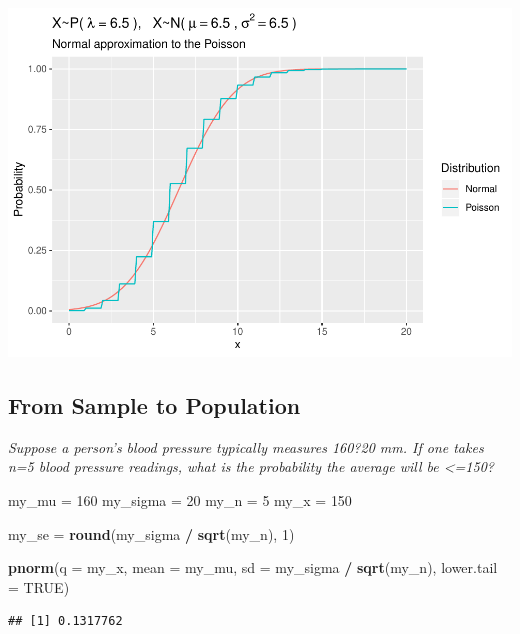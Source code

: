 \documentclass[]{book}
\newenvironment{Shaded}{\begin{snugshade}}{\end{snugshade}}
\newcommand{\DataTypeTok}[1]{\textcolor[rgb]{0.13,0.29,0.53}{#1}}
\newcommand{\DecValTok}[1]{\textcolor[rgb]{0.00,0.00,0.81}{#1}}
\newcommand{\KeywordTok}[1]{\textcolor[rgb]{0.13,0.29,0.53}{\textbf{#1}}}
\newcommand{\NormalTok}[1]{#1}
\newcommand{\OperatorTok}[1]{\textcolor[rgb]{0.81,0.36,0.00}{\textbf{#1}}}
\newcommand{\OtherTok}[1]{\textcolor[rgb]{0.56,0.35,0.01}{#1}}
\newcommand{\StringTok}[1]{\textcolor[rgb]{0.31,0.60,0.02}{#1}}
\begin{document}
\includegraphics{data-sci_files/figure-latex/unnamed-chunk-18-1.pdf}

\hypertarget{from-sample-to-population}{%
\subsection{From Sample to Population}\label{from-sample-to-population}}

\emph{Suppose a person's blood pressure typically measures 160?20 mm. If one takes n=5 blood pressure readings, what is the probability the average will be \textless=150?}

\begin{Shaded}
\begin{Highlighting}[]
\NormalTok{my_mu =}\StringTok{ }\DecValTok{160}
\NormalTok{my_sigma =}\StringTok{ }\DecValTok{20}
\NormalTok{my_n =}\StringTok{ }\DecValTok{5}
\NormalTok{my_x =}\StringTok{ }\DecValTok{150}

\NormalTok{my_se =}\StringTok{ }\KeywordTok{round}\NormalTok{(my_sigma }\OperatorTok{/}\StringTok{ }\KeywordTok{sqrt}\NormalTok{(my_n), }\DecValTok{1}\NormalTok{)}

\KeywordTok{pnorm}\NormalTok{(}\DataTypeTok{q =}\NormalTok{ my_x, }\DataTypeTok{mean =}\NormalTok{ my_mu, }\DataTypeTok{sd =}\NormalTok{ my_sigma }\OperatorTok{/}\StringTok{ }\KeywordTok{sqrt}\NormalTok{(my_n), }\DataTypeTok{lower.tail =} \OtherTok{TRUE}\NormalTok{)}
\end{Highlighting}
\end{Shaded}

\begin{verbatim}
## [1] 0.1317762
\end{verbatim}
\end{document}
